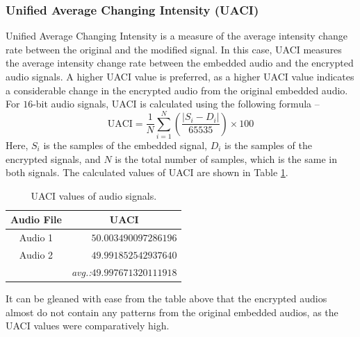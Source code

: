 \documentclass[a4paper]{cas-sc}
\begin{document}
\subsubsection{Unified Average Changing Intensity (UACI)}
Unified Average Changing Intensity is a measure of the average intensity change rate between the original and the modified signal. In this case, UACI measures the average intensity change rate between the embedded audio and the encrypted audio signals. A higher UACI value is preferred, as a higher UACI value indicates a considerable change in the encrypted audio from the original embedded audio. For $16$-bit audio signals, UACI is calculated using the following formula --
\begin{equation}
    \text{UACI}=\frac{1}{N}\sum_{i=1}^{N}\left(\frac{|S_i-D_i|}{65535}\right)\times100
\end{equation}
Here, $S_i$ is the samples of the embedded signal, $D_i$ is the samples of the encrypted signals, and $N$ is the total number of samples, which is the same in both signals. The calculated values of UACI are shown in Table \ref{table:uaci}.
\begin{table}[pos=h]
    \begin{center}
        \caption{UACI values of audio signals.}
        \begin{tabular}{cr}
            \hline
            Audio File & \multicolumn{1}{c}{UACI}                    \\ \hline
            Audio 1    & $50.003490097286196$                        \\ \hdashline
            Audio 2    & $49.991852542937640$                        \\ \hline
                       & \textit{avg.:}$\mathbf{49.997671320111918}$
        \end{tabular}
        \label{table:uaci}
    \end{center}
\end{table}

It can be gleaned with ease from the table above that the encrypted audios almost do not contain any patterns from the original embedded audios, as the UACI values were comparatively high.
\end{document}
